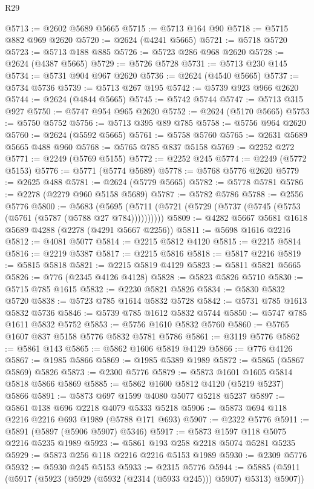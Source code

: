 \begin{lexlean}{R29}
\begin{coremodule}
@5713 := @2602 @5689 @5665
@5715 := @5713 @164 @90
@5718 := @5715 @882 @969 @2620
@5720 := @2624 (@4241 @5665)
@5721 := @5718 @5720
@5723 := @5713 @188 @885
@5726 := @5723 @286 @968 @2620
@5728 := @2624 (@4387 @5665)
@5729 := @5726 @5728
@5731 := @5713 @230 @145
@5734 := @5731 @904 @967 @2620
@5736 := @2624 (@4540 @5665)
@5737 := @5734 @5736
@5739 := @5713 @267 @195
@5742 := @5739 @923 @966 @2620
@5744 := @2624 (@4844 @5665)
@5745 := @5742 @5744
@5747 := @5713 @315 @927
@5750 := @5747 @954 @965 @2620
@5752 := @2624 (@5170 @5665)
@5753 := @5750 @5752
@5756 := @5713 @395 @89 @785
@5758 := @5756 @964 @2620
@5760 := @2624 (@5592 @5665)
@5761 := @5758 @5760
@5765 := @2631 @5689 @5665 @488 @960
@5768 := @5765 @785 @837 @5158
@5769 := @2252 @272
@5771 := @2249 (@5769 @5155)
@5772 := @2252 @245
@5774 := @2249 (@5772 @5153)
@5776 := @5771 (@5774 @5689)
@5778 := @5768 @5776 @2620
@5779 := @2625 @488
@5781 := @2624 (@5779 @5665)
@5782 := @5778 @5781
@5786 := @2278 (@2279 @960 @5158 @5689)
@5787 := @5782 @5786
@5788 := @2556 @5776
@5800 := @5683
    (@5695 (@5711 (@5721 (@5729 (@5737 (@5745 (@5753 (@5761 (@5787 (@5788 @27 @784))))))))))
@5809 := @4282 @5667 @5681 @1618 @5689 @4288 (@2278 (@4291 @5667 @2256))
@5811 := @5698 @1616 @2216
@5812 := @4081 @5077
@5814 := @2215 @5812 @4120
@5815 := @2215 @5814
@5816 := @2219 @5387
@5817 := @2215 @5816
@5818 := @5817 @2216
@5819 := @5815 @5818
@5821 := @2215 @5819 @4129
@5823 := @5811 @5821 @5665
@5826 := @776 (@2345 @4126 @4128)
@5828 := @5823 @5826 @5710
@5830 := @5715 @785 @1615
@5832 := @2230 @5821 @5826
@5834 := @5830 @5832 @5720
@5838 := @5723 @785 @1614 @5832 @5728
@5842 := @5731 @785 @1613 @5832 @5736
@5846 := @5739 @785 @1612 @5832 @5744
@5850 := @5747 @785 @1611 @5832 @5752
@5853 := @5756 @1610 @5832 @5760
@5860 := @5765 @1607 @837 @5158 @5776 @5832 @5781 @5786
@5861 := @3119 @5776
@5862 := @5861 @143
@5865 := @5862 @1606 @5819 @4129
@5866 := @776 @4126
@5867 := @1985 @5866
@5869 := @1985 @5389 @1989
@5872 := @5865 (@5867 @5869) @5826
@5873 := @2300 @5776
@5879 := @5873 @1601 @1605 @5814 @5818 @5866 @5869
@5885 := @5862 @1600 @5812 @4120 (@5219 @5237) @5866
@5891 := @5873 @697 @1599 @4080 @5077 @5218 @5237
@5897 := @5861 @138 @696 @2218 @4079 @5333 @5218
@5906 := @5873 @694 @118 @2216 @2216 @693 @1989 (@5788 @171 @693)
@5907 := @2322 @5776
@5911 := @5891 (@5897 (@5906 @5907) @5346)
@5917 := @5873 @1597 @118 @5075 @2216 @5235 @1989
@5923 := @5861 @193 @258 @2218 @5074 @5281 @5235
@5929 := @5873 @256 @118 @2216 @2216 @5153 @1989
@5930 := @2309 @5776
@5932 := @5930 @245 @5153
@5933 := @2315 @5776
@5944 := @5885 (@5911 (@5917 (@5923 (@5929 (@5932 (@2314 (@5933 @245))) @5907) @5313) @5907))

\end{coremodule}
\end{lexlean}
